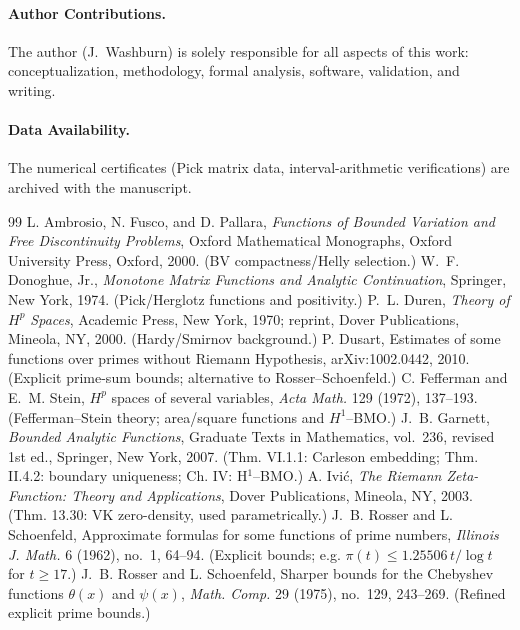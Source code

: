 \documentclass[11pt]{article}
\theoremstyle{definition}
\theoremstyle{remark}
\theoremstyle{definition}
\begin{document}
\paragraph{Author Contributions.}
The author (J.\ Washburn) is solely responsible for all aspects of this work: conceptualization, methodology, formal analysis, software, validation, and writing.

\paragraph{Data Availability.} The numerical certificates (Pick matrix data, interval-arithmetic verifications) are archived with the manuscript.

\begin{thebibliography}{99}
 L. Ambrosio, N. Fusco, and D. Pallara, \emph{Functions of Bounded Variation and Free Discontinuity Problems}, Oxford Mathematical Monographs, Oxford University Press, Oxford, 2000. (BV compactness/Helly selection.)
 W.~F. Donoghue, Jr., \emph{Monotone Matrix Functions and Analytic Continuation}, Springer, New York, 1974. (Pick/Herglotz functions and positivity.)
 P.~L. Duren, \emph{Theory of $H^p$ Spaces}, Academic Press, New York, 1970; reprint, Dover Publications, Mineola, NY, 2000. (Hardy/Smirnov background.)
 P. Dusart, Estimates of some functions over primes without Riemann Hypothesis, arXiv:1002.0442, 2010. (Explicit prime-sum bounds; alternative to Rosser--Schoenfeld.)
 C. Fefferman and E.~M. Stein, $H^p$ spaces of several variables, \emph{Acta Math.} 129 (1972), 137--193. (Fefferman--Stein theory; area/square functions and $H^1$--BMO.)
 J.~B. Garnett, \emph{Bounded Analytic Functions}, Graduate Texts in Mathematics, vol.~236, revised 1st ed., Springer, New York, 2007. (Thm. VI.1.1: Carleson embedding; Thm. II.4.2: boundary uniqueness; Ch. IV: H$^1$–BMO.)
 A. Ivi\'c, \emph{The Riemann Zeta-Function: Theory and Applications}, Dover Publications, Mineola, NY, 2003. (Thm. 13.30: VK zero-density, used parametrically.)
 J.~B. Rosser and L. Schoenfeld, Approximate formulas for some functions of prime numbers, \emph{Illinois J. Math.} 6 (1962), no.~1, 64--94. (Explicit bounds; e.g. $\pi(t)\le 1.25506\,t/\log t$ for $t\ge 17$.)
 J.~B. Rosser and L. Schoenfeld, Sharper bounds for the Chebyshev functions $\theta(x)$ and $\psi(x)$, \emph{Math. Comp.} 29 (1975), no.~129, 243--269. (Refined explicit prime bounds.)

\end{thebibliography}
\end{document}
